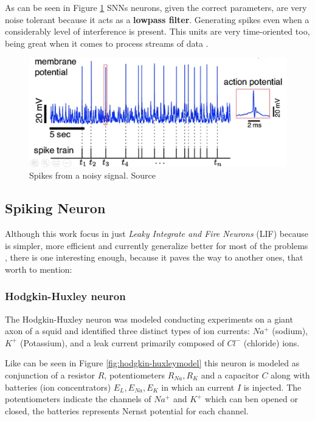 		\par As can be seen in Figure \ref{fig:neuronspike} SNNs neurons, given the correct parameters, are very noise tolerant because it acts as a \textbf{lowpass filter}. Generating spikes even when a considerably level of interference is present. This units are very time-oriented too, being great when it comes to process streams of data \cite{10242251}.
		
		\begin{figure}[H]
			\centering
			\includegraphics[width=.6\linewidth]{images/neuronSpikes}
			\caption{Spikes from a noisy signal. Source \cite{dan_goodman_2022_7044500}}
			\label{fig:neuronspike}
		\end{figure} 

	\subsection{Spiking Neuron}
		\par Although this work focus in just \textit{Leaky Integrate and Fire Neurons} (LIF) because is simpler, more efficient and currently generalize better for most of the problems \cite{dan_goodman_2022_7044500}, there is one interesting enough, because it paves the way to another ones, that worth to mention:
	
		\subsubsection{Hodgkin-Huxley neuron}
			\par The Hodgkin-Huxley neuron \cite{gerstner2014neuronal} was modeled conducting experiments on a giant axon of a squid and identified three distinct types of ion currents: $Na^+$ (sodium), $K^+$ (Potassium), and a leak current primarily composed of $Cl^-$ (chloride) ions.
			\par Like can be seen in Figure \ref{fig:hodgkin-huxleymodel} this neuron is modeled as conjunction of a resistor $R$, potentiometers $R_{Na}, R_{K}$ and a capacitor $C$ along with  batteries (ion concentrators) $E_L, E_{Na}, E_K$  in which an current $I$ is injected. The potentiometers indicate the channels of $Na^+$ and $K^+$ which can ben opened or closed, the batteries represents Nernst potential \cite{2023Gibbs} for each channel.
			
